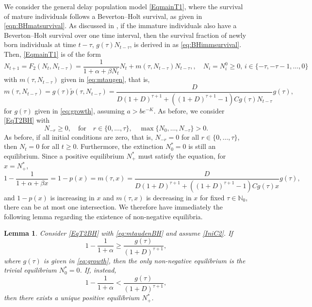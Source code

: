 \documentclass{article}
\numberwithin{theorem}{section}
\newtheorem{lemma}[theorem]{Lemma}
\begin{document}
{We consider the general delay population model \eqref{EqmainT1}, where the survival of mature individuals follows a Beverton--Holt survival, as given in \eqref{eqn:BHmatsurvival}. As discussed in \cite{StWodelay2}, if the immature individuals also have a Beverton--Holt survival over one time interval, then  the survival fraction of newly born individuals at time $t-\tau$,  $g(\tau)N_{t-\tau}$, is derived in \cite{StWodelay2} as \eqref{eq:BHimmsurvival}. 
Then, \eqref{EqmainT1} is of the form  
 \begin{equation}\label{EqT2BH}
N_{t+1}=F_2(N_t,N_{t-\tau})=\frac{1}{1+\alpha+\beta N_t}N_t + 
m(\tau, N_{t-\tau})N_{t-\tau}, , \quad  N_i=N_i^0 \geq 0, \, i  \in \{-\tau, -\tau-1, \ldots, 0\}
\end{equation}
with $m(\tau, N_{t-\tau})$ given in \eqref{eq:mtaugen}, that is, 
\begin{equation}\label{eq:mtaudenBH}
m(\tau, N_{t-\tau})= g(\tau)\widetilde{p}(\tau,N_{t-\tau})=   \frac{D}{D(1+D)^{\tau+1}+((1+D)^{\tau+1}-1)Cg(\tau)N_{t-\tau}} g(\tau),
\end{equation}
for $g(\tau)$ given in \eqref{eq:growth}, assuming $a>be^{-K}$. As before, we consider \eqref{EqT2BH} with %
\begin{equation}\label{IniC2}
    N_{-r}\geq 0, \quad \mbox{for} \quad r\in \{0, \ldots, \tau\}, \quad \max\{N_{0}, \ldots, N_{-\tau}\}>0. %
\end{equation}
As before, if all initial conditions are zero, that is, $N_{-r}=0$ for all $r\in \{0, \ldots, \tau\}$, then $N_t=0$ for all $t\geq 0$. Furthermore, the extinction $N^*_0=0$ is still an equilibrium. Since a positive equilibrium $N^*_+$ must satisfy the equation, for $x=N^*_+$, 
$$ 1-\frac{1}{1+\alpha+\beta x}= 1-p(x)=m(\tau, x)=
\frac{D}{D(1+D)^{\tau+1}+((1+D)^{\tau+1}-1)Cg(\tau)x} g(\tau),$$  and $1-p(x)$ is increasing in $x$ and $m(\tau, x)$ is decreasing in $x$ for fixed $\tau\in \mathbb{N}_0$, there can be at most one intersection. We therefore have immediately the following lemma regarding the existence of non-negative equilibria. 

\begin{lemma}\label{lem:BHBHinequlity}
Consider \eqref{EqT2BH} with \eqref{eq:mtaudenBH} and assume \eqref{IniC2}. If 
\begin{equation}\label{eq:condN0only}
    1-\frac{1}{1+\alpha}\geq \frac{g(\tau)}{(1+D)^{\tau+1}},
\end{equation}
where $g(\tau)$ is given in \eqref{eq:growth}, then 
the only non-negative equilibrium is the trivial equilibrium $N^*_0=0$. If, instead, 
\begin{equation}\label{eq:condNstar}
    1-\frac{1}{1+\alpha}< \frac{g(\tau)}{(1+D)^{\tau+1}},
\end{equation}
then there exists a unique positive equilibrium $N^*_+$.
\end{lemma}

}
\end{document}
